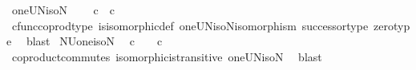 \begin{isabellebody}
%
\endisatagproof
{\isafoldproof}%
%
\isadelimproof
%
\endisadelimproof
%
\isadelimdocument
%
\endisadelimdocument
%
\isatagdocument
%
\isamarkuptrue%
%
\endisatagdocument
{\isafolddocument}%
%
\isadelimdocument
%
\endisadelimdocument
{}\isamarkupfalse%
\ oneUN{\isacharunderscore}{\kern0pt}iso{\isacharunderscore}{\kern0pt}N{\isacharcolon}{\kern0pt}\isanewline
\ \ {\isachardoublequoteopen}{\isasymone}\ {\isasymCoprod}\ {\isasymnat}\isactrlsub c\ {\isasymcong}\ {\isasymnat}\isactrlsub c{\isachardoublequoteclose}\isanewline
%
\isadelimproof
\ \ %
\endisadelimproof
%
\isatagproof
{}\isamarkupfalse%
\ cfunc{\isacharunderscore}{\kern0pt}coprod{\isacharunderscore}{\kern0pt}type\ is{\isacharunderscore}{\kern0pt}isomorphic{\isacharunderscore}{\kern0pt}def\ oneUN{\isacharunderscore}{\kern0pt}iso{\isacharunderscore}{\kern0pt}N{\isacharunderscore}{\kern0pt}isomorphism\ successor{\isacharunderscore}{\kern0pt}type\ zero{\isacharunderscore}{\kern0pt}type\ \isamarkupfalse%
\ blast%
\endisatagproof
{\isafoldproof}%
%
\isadelimproof
\isanewline
%
\endisadelimproof
\isanewline
{}\isamarkupfalse%
\ NUone{\isacharunderscore}{\kern0pt}iso{\isacharunderscore}{\kern0pt}N{\isacharcolon}{\kern0pt}\isanewline
\ \ {\isachardoublequoteopen}{\isasymnat}\isactrlsub c\ {\isasymCoprod}\ {\isasymone}\ {\isasymcong}\ {\isasymnat}\isactrlsub c{\isachardoublequoteclose}\isanewline
%
\isadelimproof
\ \ %
\endisadelimproof
%
\isatagproof
{}\isamarkupfalse%
\ coproduct{\isacharunderscore}{\kern0pt}commutes\ isomorphic{\isacharunderscore}{\kern0pt}is{\isacharunderscore}{\kern0pt}transitive\ oneUN{\isacharunderscore}{\kern0pt}iso{\isacharunderscore}{\kern0pt}N\ \isamarkupfalse%
\ blast%
\endisatagproof
{\isafoldproof}%
%
\isadelimproof
\isanewline
%
\endisadelimproof
%
\isadelimtheory
\ \ \isanewline
%
\endisadelimtheory
%
\isatagtheory
{}\isamarkupfalse%
%
\endisatagtheory
{\isafoldtheory}%
%
\isadelimtheory
%
\endisadelimtheory
%
\end{isabellebody}%
\endinput
